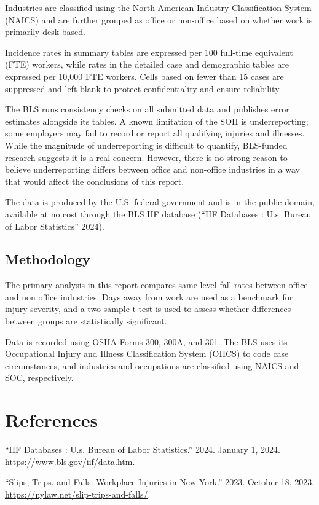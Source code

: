 \documentclass[
  letterpaper,
  DIV=11,
  numbers=noendperiod]{scrreprt}
\newlength{\cslhangindent}
\newenvironment{CSLReferences}[2] %
 {\begin{list}{}{%
  \setlength{\itemindent}{0pt}
  \setlength{\leftmargin}{0pt}
  \setlength{\parsep}{0pt}
  \ifodd #1
   \setlength{\leftmargin}{\cslhangindent}
   \setlength{\itemindent}{-1\cslhangindent}
  \fi
  \setlength{\itemsep}{#2\baselineskip}}}
 {\end{list}}
\begin{document}
Industries are classified using the North American Industry
Classification System (NAICS) and are further grouped as office or
non-office based on whether work is primarily desk-based.

Incidence rates in summary tables are expressed per 100 full-time
equivalent (FTE) workers, while rates in the detailed case and
demographic tables are expressed per 10,000 FTE workers. Cells based on
fewer than 15 cases are suppressed and left blank to protect
confidentiality and ensure reliability.

The BLS runs consistency checks on all submitted data and publishes
error estimates alongside its tables. A known limitation of the SOII is
underreporting; some employers may fail to record or report all
qualifying injuries and illnesses. While the magnitude of underreporting
is difficult to quantify, BLS-funded research suggests it is a real
concern. However, there is no strong reason to believe underreporting
differs between office and non-office industries in a way that would
affect the conclusions of this report.

The data is produced by the U.S. federal government and is in the public
domain, available at no cost through the BLS IIF database ({``{IIF}
Databases : U.s. Bureau of Labor Statistics''} 2024).

\section{Methodology}\label{methodology-1}

The primary analysis in this report compares same level fall rates
between office and non office industries. Days away from work are used
as a benchmark for injury severity, and a two sample t-test is used to
assess whether differences between groups are statistically significant.

Data is recorded using OSHA Forms 300, 300A, and 301. The BLS uses its
Occupational Injury and Illness Classification System (OIICS) to code
case circumstances, and industries and occupations are classified using
NAICS and SOC, respectively.

\chapter*{References}\label{references-1}


\label{refs}
\begin{CSLReferences}{1}{0}
{``{IIF} Databases : U.s. Bureau of Labor Statistics.''} 2024. January
1, 2024. \url{https://www.bls.gov/iif/data.htm}.

{``Slips, {Trips}, and {Falls}: {Workplace Injuries} in {New York}.''}
2023. October 18, 2023. \url{https://nylaw.net/slip-trips-and-falls/}.

\end{CSLReferences}
\end{document}
